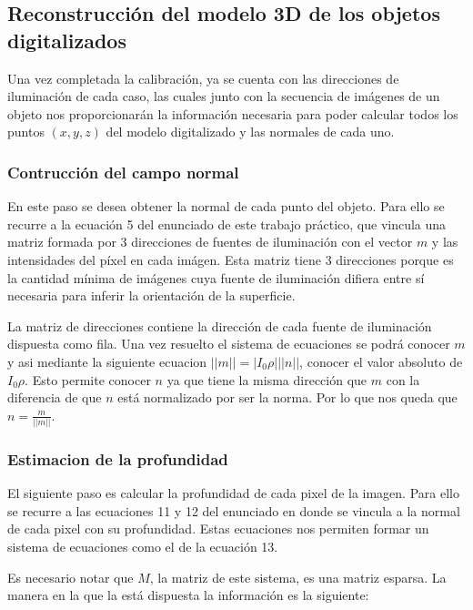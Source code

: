 \subsection{Reconstrucción del modelo 3D de los objetos digitalizados}

Una vez completada la calibración, ya se cuenta con las direcciones de
iluminación de cada caso, las cuales junto con la secuencia de imágenes de un
objeto nos proporcionarán la información necesaria para poder calcular todos
los puntos $(x,y,z)$ del modelo digitalizado y las normales de cada uno.

\subsubsection{Contrucción del campo normal}

En este paso se desea obtener la normal de cada punto del objeto. Para ello
se recurre a la ecuación 5 del enunciado de este trabajo práctico, que
vincula una matriz formada por 3 direcciones de fuentes de iluminación con el
vector $m$ y las intensidades del píxel en cada imágen. Esta matriz tiene 3
direcciones porque es la cantidad mínima de imágenes cuya fuente de
iluminación difiera entre sí necesaria para inferir la orientación de la
superficie.

La matriz de direcciones contiene la dirección de cada fuente de iluminación
dispuesta como fila. Una vez resuelto el sistema de ecuaciones se podrá
conocer $m$ y asi mediante la siguiente ecuacion $||m|| = |I_0\rho| ||n||$,
conocer el valor absoluto de $I_0\rho$. Esto permite conocer $n$ ya que tiene
la misma dirección que $m$ con la diferencia de que $n$ está normalizado
por ser la norma. Por lo que nos queda que $n = \frac{m}{||m||}$.

\subsubsection{Estimacion de la profundidad}

El siguiente paso es calcular la profundidad de cada pixel de la imagen. Para ello se recurre a las ecuaciones 11 y 12 del enunciado en donde se vincula a la normal de cada pixel con su profundidad. Estas ecuaciones nos permiten formar un sistema de ecuaciones como el de la ecuación 13.

Es necesario notar que $M$, la matriz de este sistema, es una matriz esparsa. La manera en la que la está dispuesta la información es la siguiente:

